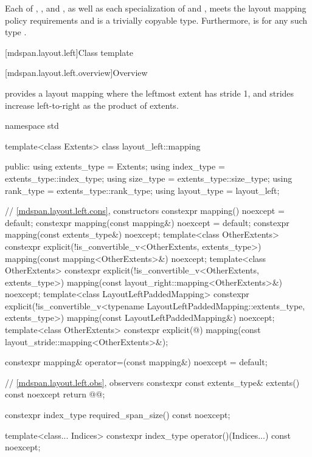 \pnum
Each of , , and ,
as well as each specialization of
 and ,
meets the layout mapping policy requirements and is a trivially copyable type.
Furthermore,
 is 
for any such type .

[mdspan.layout.left]{Class template }

[mdspan.layout.left.overview]{Overview}

\pnum
{} provides a layout mapping
where the leftmost extent has stride 1, and
strides increase left-to-right as the product of extents.

\begin{codeblock}
namespace std {
  template<class Extents>
  class layout_left::mapping {
  public:
    using extents_type = Extents;
    using index_type = extents_type::index_type;
    using size_type = extents_type::size_type;
    using rank_type = extents_type::rank_type;
    using layout_type = layout_left;

    // \ref{mdspan.layout.left.cons}, constructors
    constexpr mapping() noexcept = default;
    constexpr mapping(const mapping&) noexcept = default;
    constexpr mapping(const extents_type&) noexcept;
    template<class OtherExtents>
      constexpr explicit(!is_convertible_v<OtherExtents, extents_type>)
        mapping(const mapping<OtherExtents>&) noexcept;
    template<class OtherExtents>
      constexpr explicit(!is_convertible_v<OtherExtents, extents_type>)
        mapping(const layout_right::mapping<OtherExtents>&) noexcept;
    template<class LayoutLeftPaddedMapping>
      constexpr explicit(!is_convertible_v<typename LayoutLeftPaddedMapping::extents_type,
                                           extents_type>)
        mapping(const LayoutLeftPaddedMapping&) noexcept;
    template<class OtherExtents>
      constexpr explicit(@\seebelow@)
        mapping(const layout_stride::mapping<OtherExtents>&);

    constexpr mapping& operator=(const mapping&) noexcept = default;

    // \ref{mdspan.layout.left.obs}, observers
    constexpr const extents_type& extents() const noexcept { return @@; }

    constexpr index_type required_span_size() const noexcept;

    template<class... Indices>
      constexpr index_type operator()(Indices...) const noexcept;

}}
\end{codeblock}

